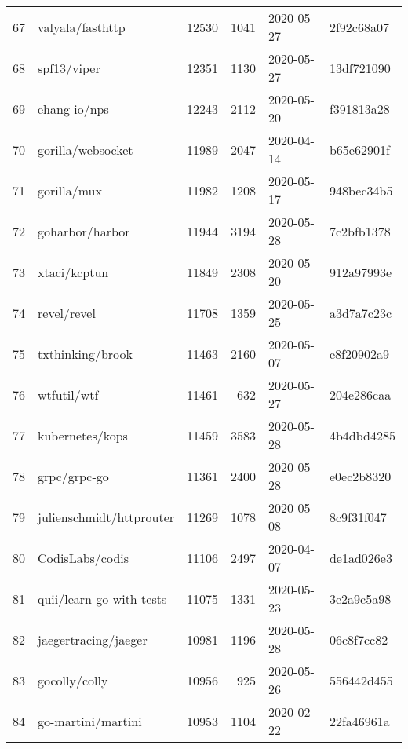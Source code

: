 \begin{longtable}{llrrll}
    67  &                                   valyala/fasthttp &  12530 &   1041 & 2020-05-27 &  2f92c68a07 \\
    68  &                                        spf13/viper &  12351 &   1130 & 2020-05-27 &  13df721090 \\
    69  &                                       ehang-io/nps &  12243 &   2112 & 2020-05-20 &  f391813a28 \\
    70  &                                  gorilla/websocket &  11989 &   2047 & 2020-04-14 &  b65e62901f \\
    71  &                                        gorilla/mux &  11982 &   1208 & 2020-05-17 &  948bec34b5 \\
    72  &                                    goharbor/harbor &  11944 &   3194 & 2020-05-28 &  7c2bfb1378 \\
    73  &                                       xtaci/kcptun &  11849 &   2308 & 2020-05-20 &  912a97993e \\
    74  &                                        revel/revel &  11708 &   1359 & 2020-05-25 &  a3d7a7c23c \\
    75  &                                   txthinking/brook &  11463 &   2160 & 2020-05-07 &  e8f20902a9 \\
    76  &                                        wtfutil/wtf &  11461 &    632 & 2020-05-27 &  204e286caa \\
    77  &                                    kubernetes/kops &  11459 &   3583 & 2020-05-28 &  4b4dbd4285 \\
    78  &                                       grpc/grpc-go &  11361 &   2400 & 2020-05-28 &  e0ec2b8320 \\
    79  &                           julienschmidt/httprouter &  11269 &   1078 & 2020-05-08 &  8c9f31f047 \\
    80  &                                    CodisLabs/codis &  11106 &   2497 & 2020-04-07 &  de1ad026e3 \\
    81  &                           quii/learn-go-with-tests &  11075 &   1331 & 2020-05-23 &  3e2a9c5a98 \\
    82  &                               jaegertracing/jaeger &  10981 &   1196 & 2020-05-28 &  06c8f7cc82 \\
    83  &                                      gocolly/colly &  10956 &    925 & 2020-05-26 &  556442d455 \\
    84  &                                 go-martini/martini &  10953 &   1104 & 2020-02-22 &  22fa46961a \\

\end{longtable}
